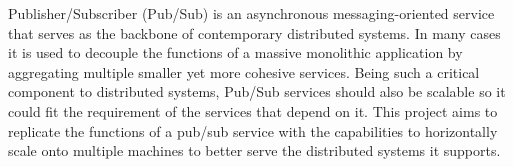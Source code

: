 Publisher/Subscriber (Pub/Sub) is an asynchronous messaging-oriented service that serves as the backbone of contemporary distributed systems. In many cases it is used to decouple the functions of a massive monolithic application by aggregating multiple smaller yet more cohesive services. Being such a critical component to distributed systems, Pub/Sub services should also be scalable so it could fit the requirement of the services that depend on it. This project aims to replicate the functions of a pub/sub service with the capabilities to horizontally scale onto multiple machines to better serve the distributed systems it supports.
